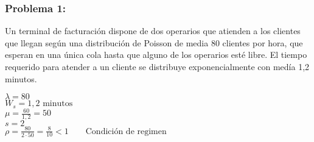 \documentclass{templateNote}
\begin{document}
\newpage
\subsubsection{Problema 1:}
Un terminal de facturaci\'on dispone de dos operarios que atienden a los clientes que llegan seg\'un una distribuci\'on de Poisson de media 80 clientes por hora, que esperan en una \'unica cola hasta que alguno de los operarios est\'e libre. El tiempo requerido para atender a un cliente se distribuye exponencialmente con med\'ia 1,2 minutos.
\begin{tcolorbox}[
    colframe=Celeste!100, %
    colback=Celeste!20,       %
    coltitle=white!100, %
    title=\textbf{Datos}, %
]
    $\lambda = 80$ \\
    $W_s = 1,2 \text{ minutos}$ \\
    $\mu = \frac{60}{1,2} = 50$ \\
    $s = 2$ \\
    $\rho = \frac{80}{2 \cdot 50} = \frac{8}{10} < 1 \qquad \text{Condici\'on de regimen}$
\end{tcolorbox}
\end{document}
